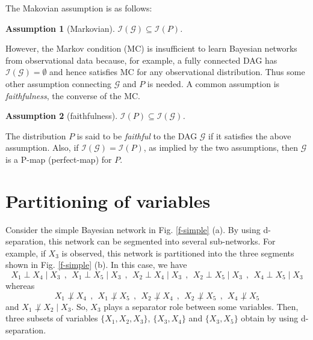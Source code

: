 \documentclass{article}
\newtheorem{assumption}{Assumption}
\newcommand{\I}{\mathcal{I}}
\newcommand{\G}{\mathcal{G}}
\begin{document}
The Makovian assumption is as follows:
\begin{assumption}[Markovian] \label{assumption_Markovness}
    $\I(\G)\subseteq \I(P)$.
\end{assumption}
However, the Markov condition (MC) is insufficient to learn Bayesian networks from observational data because, for example, a fully connected DAG has $\I(\G) = \emptyset$ and hence satisfies MC for any observational distribution.
Thus some other assumption connecting \(\G\) and \(P\) is needed.
A common assumption is \emph{faithfulness}, the converse of the MC. 
\begin{assumption}[faithfulness] \label{assumption_faithfulness}
    $\mathcal{I}(P) \subseteq \mathcal{I}(\mathcal{G})$.
\end{assumption}
The distribution $P$ is said to be \emph{faithful} to the DAG $\G$ if it satisfies the above assumption. Also, if $\I(\G) = \I(P)$, as implied by the
two assumptions, then $\G$ is a P-map (perfect-map) for $P$. 

\section{Partitioning of variables}
Consider the simple Bayesian network in Fig.\! \ref{f-simple} (a). By using d-separation, this network can be segmented into several sub-networks. For example, if \(X_3\) is observed, this network is partitioned into the three segments shown in Fig.\! \ref{f-simple} (b). In this case, we have
\begin{equation*}
    X_1 \perp X_4 \mid X_3~~,~~X_1 \perp X_5 \mid X_3~~,~~X_2 \perp X_4 \mid X_3~~,~~X_2 \perp X_5 \mid X_3~~,~~X_4 \perp X_5 \mid X_3
\end{equation*}
whereas 
\begin{equation*}
    X_1 \not\perp X_4~~, ~~X_1\not \perp X_5~~, ~~X_2 \not\perp X_4~~, ~~X_2\not \perp X_5~~, ~~X_4\not \perp X_5
\end{equation*}
and $X_1\not \perp X_2 \mid X_3$. So, $X_3$ plays a separator role between some variables. Then, three subsets of variables $\{X_1, X_2, X_3\}$, $\{X_3, X_4\}$ and $\{X_3,X_5\}$ obtain by using d-separation. 
\end{document}
